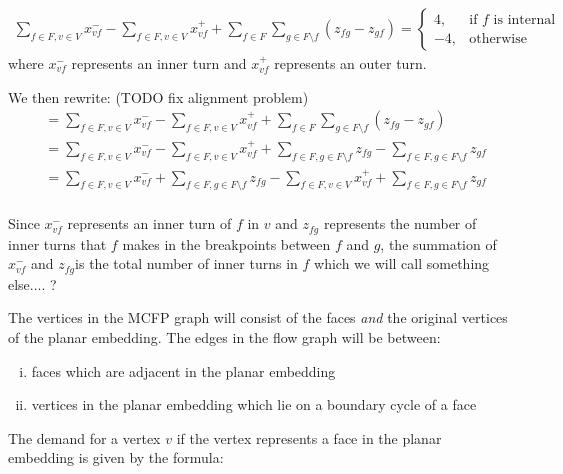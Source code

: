 \documentclass[12pt]{article}
\begin{document}
\begin{align*}
  \sum_{f \in F, v \in V}{x_{vf}^{-}} - \sum_{f \in F, v \in V}{x_{vf}^{+}} + \sum_{f \in F}\sum_{g \in F \setminus f}(z_{fg} - z_{gf}) = \begin{cases}
                                                                                       4, & \text{if } f \text{ is internal}\\
                                                                                      -4, & \text{otherwise}
                                                                                   \end{cases}
\end{align*}
where $x_{vf}^{-}$ represents an inner turn and $x_{vf}^{+}$ represents an outer turn.

We then rewrite: (TODO fix alignment problem)
\begin{align*}
  &= \sum_{f \in F, v \in V}{x_{vf}^{-}} - \sum_{f \in F, v \in V}{x_{vf}^{+}} + \sum_{f \in F}\sum_{g \in F \setminus f}(z_{fg} - z_{gf})\\
  &= \sum_{f \in F, v \in V}{x_{vf}^{-}} - \sum_{f \in F, v \in V}{x_{vf}^{+}} + \sum_{f \in F, g \in F\setminus f}{z_{fg}} - \sum_{f \in F, g \in F \setminus f}z_{gf}\\
  &= \sum_{f \in F, v \in V}{x_{vf}^{-}} + \sum_{f \in F, g \in F\setminus f}{z_{fg}} - \sum_{f \in F, v \in V}{x_{vf}^{+}} + \sum_{f \in F, g \in F \setminus f}z_{gf}\\
\end{align*}

Since $x_{vf}^{-}$ represents an inner turn of $f$ in $v$ and $z_{fg}$ represents the number of inner turns that $f$ makes in the breakpoints between $f$ and $g$, the summation of $x_{vf}^{-}$ and $z_{fg} $is the total number of inner turns in $f$ which we will call something else.... ?

The vertices in the MCFP graph will consist of the faces \textit{and} the original vertices of the planar embedding. The edges in the flow graph will be between:

\begin{enumerate}[(i)]
  \item faces which are adjacent in the planar embedding
  \item vertices in the planar embedding which lie on a boundary cycle of a face
\end{enumerate}

The demand for a vertex $v$ if the vertex represents a face in the planar embedding is given by the formula:
\end{document}
